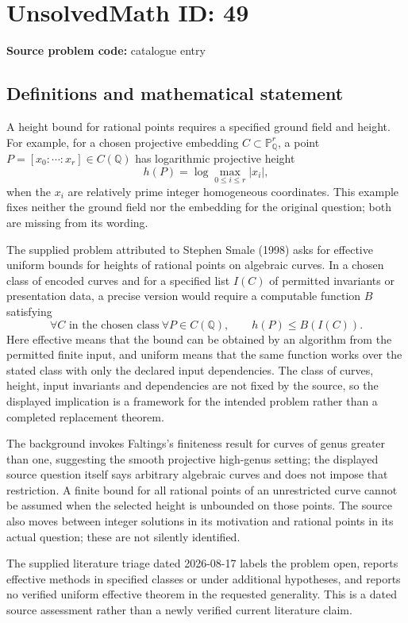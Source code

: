 \documentclass[11pt]{article}
\newcommand{\Q}{\mathbb{Q}}
\newcommand{\PP}{\mathbb{P}}
\begin{document}
\section*{UnsolvedMath ID: 49}
\textbf{Source problem code:} catalogue entry
\subsection{Definitions and mathematical statement}
A height bound for rational points requires a specified ground field and height. For example, for a chosen projective embedding \(C\subset\PP^r_{\Q}\), a point \(P=[x_0:\cdots:x_r]\in C(\Q)\) has logarithmic projective height
\[
h(P)=\log\max_{0\leq i\leq r}|x_i|,
\]
when the \(x_i\) are relatively prime integer homogeneous coordinates. This example fixes neither the ground field nor the embedding for the original question; both are missing from its wording.

The supplied problem attributed to Stephen Smale (1998) asks for effective uniform bounds for heights of rational points on algebraic curves. In a chosen class of encoded curves and for a specified list \(I(C)\) of permitted invariants or presentation data, a precise version would require a computable function \(B\) satisfying
\[
\forall C\text{ in the chosen class}\ \forall P\in C(\Q),\qquad
h(P)\leq B(I(C)).
\]
Here effective means that the bound can be obtained by an algorithm from the permitted finite input, and uniform means that the same function works over the stated class with only the declared input dependencies. The class of curves, height, input invariants and dependencies are not fixed by the source, so the displayed implication is a framework for the intended problem rather than a completed replacement theorem.

The background invokes Faltings's finiteness result for curves of genus greater than one, suggesting the smooth projective high-genus setting; the displayed source question itself says arbitrary algebraic curves and does not impose that restriction. A finite bound for all rational points of an unrestricted curve cannot be assumed when the selected height is unbounded on those points. The source also moves between integer solutions in its motivation and rational points in its actual question; these are not silently identified.

The supplied literature triage dated 2026-08-17 labels the problem open, reports effective methods in specified classes or under additional hypotheses, and reports no verified uniform effective theorem in the requested generality. This is a dated source assessment rather than a newly verified current literature claim.
\end{document}
